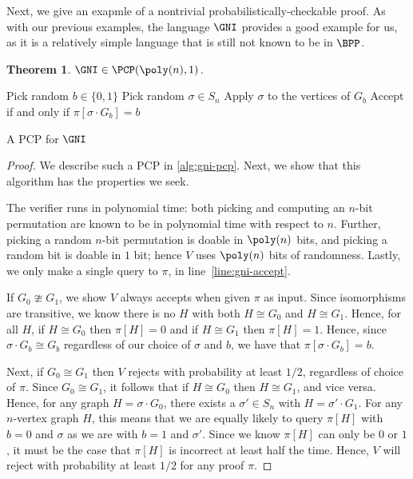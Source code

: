 \documentclass[english,12pt]{reedthesis}
\theoremstyle{plain}
\newtheorem{thm}{Theorem}[section]
\theoremstyle{definition}
\theoremstyle{remark}
\begin{document}
Next, we give an exapmle of a nontrivial probabilistically-checkable proof. As
with our previous examples, the language $\GNI$ provides a good example for us,
as it is a relatively simple language that is still not known to be in $\BPP$.

\begin{thm}\label{thm:gni-pcp}
  $\GNI \in \PCP(\poly(n), 1)$.
\end{thm}

\begin{algorithm}[htbp]
  \KwRet{$\pi$}\;
  Pick random $b \in \{0, 1\}$\;
  Pick random $\sigma \in S_{n}$\;
  Apply $\sigma$ to the vertices of $G_{b}$\;
  Accept if and only if $\pi[\sigma \cdot G_{b}] = b$\;
  \caption{A PCP for $\GNI$}\label{alg:gni-pcp}
\end{algorithm}

\begin{proof}
  We describe such a PCP in \cref{alg:gni-pcp}. Next, we show that this
  algorithm has the properties we seek.

  The verifier runs in polynomial time: both picking and computing an $n$-bit
  permutation are known to be in polynomial time with respect to $n$. Further,
  picking a random $n$-bit permutation is doable in $\poly(n)$ bits, and picking
  a random bit is doable in $1$ bit; hence $V$ uses $\poly(n)$ bits of
  randomness. Lastly, we only make a single query to $\pi$, in
  line~\ref{line:gni-accept}.

  If $G_{0} \ncong G_{1}$, we show $V$ always accepts when given $\pi$ as input. Since
  isomorphisms are transitive, we know there is no $H$ with both $H \cong G_{0}$ and
  $H \cong G_{1}$. Hence, for all $H$, if $H \cong G_{0}$ then $\pi[H] = 0$ and if
  $H \cong G_{1}$ then $\pi[H] = 1$. Hence, since $\sigma \cdot G_{b} \cong G_{b}$ regardless of
  our choice of $\sigma$ and $b$, we have that $\pi[\sigma \cdot G_{b}] = b$.

  Next, if $G_{0} \cong G_{1}$ then $V$ rejects with probability at least $1/2$,
  regardless of choice of $\pi$. Since $G_{0} \cong G_{1}$, it follows that if
  $H \cong G_{0}$ then $H \cong G_{1}$, and vice versa. Hence, for any graph
  $H = \sigma \cdot G_{0}$, there exists a $\sigma' \in S_{n}$ with $H = \sigma' \cdot G_{1}$. For any
  $n$-vertex graph $H$, this means that we are equally likely to query $\pi[H]$
  with $b = 0$ and $\sigma$ as we are with $b = 1$ and $\sigma'$. Since we know $\pi[H]$ can
  only be $0$ or $1$, it must be the case that $\pi[H]$ is incorrect at least half
  the time. Hence, $V$ will reject with probability at least $1/2$ for any proof
  $\pi$.
\end{proof}
\end{document}
